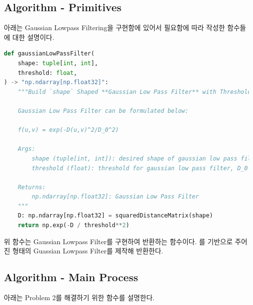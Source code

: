 \documentclass{report}
\begin{document}
\subsection*{Algorithm - Primitives}

아래는 Gaussian Lowpass Filtering을 구현함에 있어서 필요함에 따라 작성한 함수들에 대한 설명이다.

\begin{lstlisting}[language=Python, caption=Primitive - gaussianLowPassFilter, firstnumber=147]
def gaussianLowPassFilter(
    shape: tuple[int, int],
    threshold: float,
) -> "np.ndarray[np.float32]":
    """Build `shape` Shaped **Gaussian Low Pass Filter** with Threshold.

    Gaussian Low Pass Filter can be formulated below:

    f(u,v) = exp(-D(u,v)^2/D_0^2)

    Args:
        shape (tuple[int, int]): desired shape of gaussian low pass filter
        threshold (float): threshold for gaussian low pass filter, D_0

    Returns:
        np.ndarray[np.float32]: Gaussian Low Pass Filter
    """
    D: np.ndarray[np.float32] = squaredDistanceMatrix(shape)
    return np.exp(-D / threshold**2)
\end{lstlisting}

위 함수는 Gaussian Lowpass Filter를 구현하여 반환하는 함수이다.
를 기반으로 주어진  형태의 Guassian Lowpass Filter를 제작해 반환한다.

\subsection*{Algorithm - Main Process}

아래는 Problem 2를 해결하기 위한 함수를 설명한다.
\end{document}
